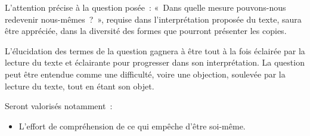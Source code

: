 {L'attention précise à la question posée~: «~Dans quelle mesure pouvons-nous
redevenir nous-mêmes~?~», requise dans l'interprétation proposée du texte, saura être
appréciée, dans la diversité des formes que pourront présenter les copies.

L'élucidation des termes de la question gagnera à être tout à la fois éclairée par
la lecture du texte et éclairante pour progresser dans son interprétation. La question
peut être entendue comme une difficulté, voire une objection, soulevée par la lecture
du texte, tout en étant son objet.

Seront valorisés notamment~:

\begin{itemize}
\item L'effort de compréhension de ce qui empêche d'être soi-même.


\end{itemize}}
